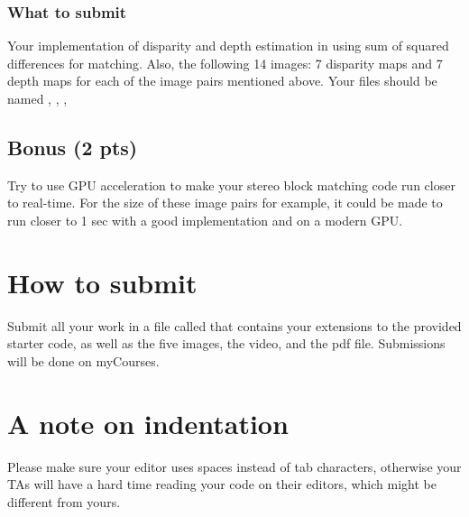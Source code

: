 \documentclass[a4paper,10pt]{article}
\begin{document}
\subsubsection{What to submit}
Your implementation of disparity and depth estimation in  using sum of squared differences for matching. Also, the following 14 images: 
7 disparity maps and 7 depth maps for each of the image pairs mentioned above. Your files should be named , , , 

\subsection{Bonus (2 pts)}
Try to use GPU acceleration to make your stereo block matching code run closer to real-time. For the size of these image pairs for example, it could be made to run closer to 1 sec
with a good implementation and on a modern GPU. 


\section{How to submit}
Submit all your work in a file called  that contains your extensions to the provided starter code, as well as the five images, the video, and the pdf file. 
Submissions will be done on myCourses. 

\section{A note on indentation}
Please make sure your editor uses spaces instead of tab characters, otherwise your TAs will have a hard time reading your code on their editors, which might be different from yours.
\end{document}
